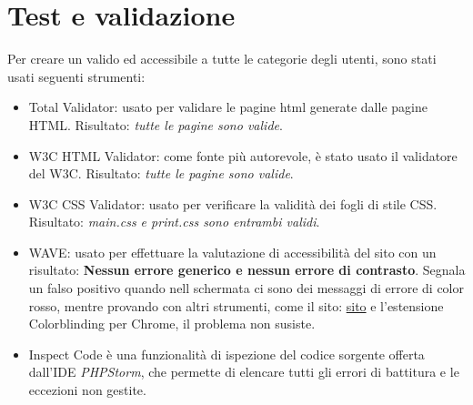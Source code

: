 \documentclass[1_relazione.tex]{subfiles}
\begin{document}
    \section{Test e validazione}\label{sec:test-e-validazione}
    Per creare un valido ed accessibile a tutte le categorie degli utenti, sono stati usati seguenti strumenti:
    \begin{itemize}
        \item{Total Validator}: usato per validare le pagine html generate dalle pagine HTML. Risultato: \textit{tutte le pagine sono valide}.
        \item{W3C HTML Validator}: come fonte pi\`{u} autorevole, \`{e} stato usato il validatore del W3C. Risultato: \textit{tutte le pagine sono valide}.
        \item{W3C CSS Validator}: usato per verificare la validit\`{a} dei fogli di stile CSS. Risultato: \textit{main.css e print.css sono entrambi validi}.
        \item{WAVE}: usato per effettuare la valutazione di accessibilit\`{a} del sito con un risultato: \textbf{Nessun errore generico e nessun errore di contrasto}. Segnala un falso positivo quando nell schermata ci sono dei messaggi di errore di color rosso, mentre provando con altri strumenti, come il sito: \href{https://www.color-blindness.com/coblis-color-blindness-simulator/}{sito} e l'estensione Colorblinding per Chrome, il problema non susiste. 
        \item{Inspect Code} \`{e} una funzionalit\`{a} di ispezione del codice sorgente offerta dall'IDE \textit{PHPStorm}, che permette di elencare tutti gli errori di battitura e le eccezioni non gestite.
    \end{itemize}
\end{document}
